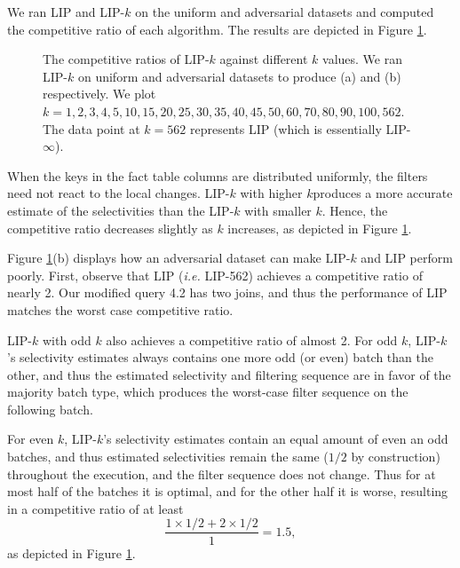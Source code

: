 We ran LIP and LIP-$k$ on the uniform and adversarial datasets and computed the competitive ratio of each algorithm.
The results are depicted in Figure \ref{fig:cr}. 

\begin{figure}
    \centering

    \quad
    
    \caption{The competitive ratios of LIP-$k$ against different $k$ values. We ran LIP-$k$ on uniform and adversarial datasets to produce (a) and (b) respectively. We plot $k = 1, 2, 3, 4, 5, 10, 15, 20, 25, 30, 35, 40, 45, 50, 60, 70, 80, 90, 100, 562$. The data point at $k = 562$ represents LIP (which is essentially LIP-$\infty$).}
    \label{fig:cr}
\end{figure}

When the keys in the fact table columns are distributed uniformly, the filters need not react to the local changes. LIP-$k$ with higher $k$produces a more accurate estimate of the selectivities than the LIP-$k$ with smaller $k$. Hence, the competitive ratio decreases slightly as $k$ increases, as depicted in Figure \ref{fig:cr}.

Figure \ref{fig:cr}(b) displays how an adversarial dataset can make LIP-$k$ and LIP perform poorly. 
First, observe that LIP ({\it i.e.} LIP-562) achieves a competitive ratio of nearly 2.
Our modified query 4.2 has two joins, and thus the performance of LIP matches the worst case competitive ratio. 

LIP-$k$ with odd $k$ also achieves a competitive ratio of almost 2. 
For odd $k$, LIP-$k$'s selectivity estimates always contains one more odd (or even) batch than the other, 
and thus the estimated selectivity and filtering sequence are in favor of the majority batch type,
which produces the worst-case filter sequence on the following batch.

For even $k$, LIP-$k$'s selectivity estimates contain an equal amount of even an odd batches,  
and thus estimated selectivities remain the same ($1/2$ by construction) throughout the execution, 
and the filter sequence does not change. Thus for at most half of the batches it is optimal, 
and for the other half it is worse, 
resulting in a competitive ratio of at least \[ \frac{1 \times 1/2 + 2 \times 1/2}{1} = 1.5,\] as depicted in Figure \ref{fig:cr}. 

